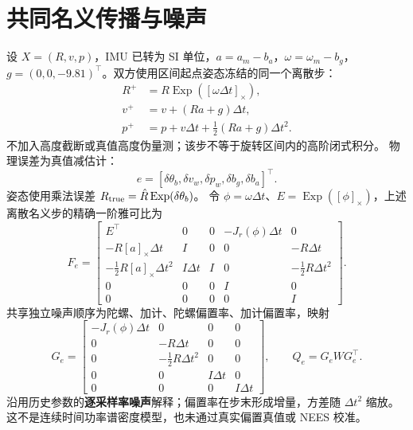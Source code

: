 \documentclass[11pt,a4paper]{ctexart}
\begin{document}
\section{共同名义传播与噪声}
设 $X=(R,v,p)$，IMU 已转为 SI 单位，$a=a_m-b_a$，$\omega=\omega_m-b_g$，
$g=(0,0,-9.81)^\top$。双方使用区间起点姿态冻结的同一个离散步：
\begin{align}
R^+&=R\operatorname{Exp}([\omega\Delta t]_\times),\\
v^+&=v+(Ra+g)\Delta t,\\
p^+&=p+v\Delta t+\tfrac12(Ra+g)\Delta t^2.
\end{align}
不加入高度截断或真值高度伪量测；该步不等于旋转区间内的高阶闭式积分。
物理误差为真值减估计：
\begin{equation}
e=[\delta\theta_b,\delta v_w,\delta p_w,\delta b_g,\delta b_a]^\top.
\end{equation}
姿态使用乘法误差 $R_{\rm true}=\hat R\operatorname{Exp}(\delta\theta_b)$。
令 $\phi=\omega\Delta t$、$E=\operatorname{Exp}([\phi]_\times)$，上述离散名义步的精确一阶雅可比为
\begin{equation}
F_e=\begin{bmatrix}
E^\top&0&0&-J_r(\phi)\Delta t&0\\
-R[a]_\times\Delta t&I&0&0&-R\Delta t\\
-\frac12R[a]_\times\Delta t^2&I\Delta t&I&0&-\frac12R\Delta t^2\\
0&0&0&I&0\\0&0&0&0&I
\end{bmatrix}.
\end{equation}
共享独立噪声顺序为陀螺、加计、陀螺偏置率、加计偏置率，映射
\begin{equation}
G_e=\begin{bmatrix}
-J_r(\phi)\Delta t&0&0&0\\
0&-R\Delta t&0&0\\
0&-\frac12R\Delta t^2&0&0\\
0&0&I\Delta t&0\\0&0&0&I\Delta t
\end{bmatrix},\qquad Q_e=G_eWG_e^\top.
\end{equation}
沿用历史参数的\textbf{逐采样率噪声}解释；偏置率在步末形成增量，方差随 $\Delta t^2$ 缩放。
这不是连续时间功率谱密度模型，也未通过真实偏置真值或 NEES 校准。
\end{document}
